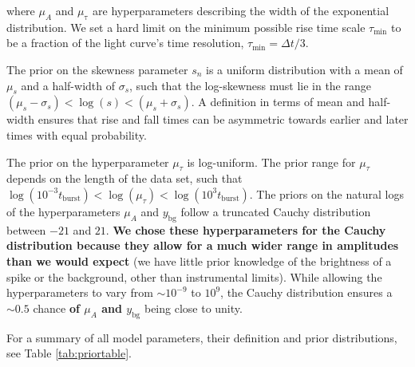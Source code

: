 \documentclass[12pt]{emulateapj}
\newcommand{\counts}{y}
\begin{document}
where $\mu_A$ and $\mu_{\mathrm{\tau}}$ are hyperparameters describing the width of the exponential distribution.
We set a hard limit on the minimum possible rise time scale
$\tau_{\mathrm{min}}$ to be a fraction of the light curve's time
resolution, $\tau_{\mathrm{min}} = \Delta t/3$. 

The prior on the skewness parameter $s_n$ is a uniform distribution with a mean of $\mu_s$ and a half-width of $\sigma_s$, such
that the log-skewness must lie in the range $(\mu_s-\sigma_s) < \log{(s)} < (\mu_s+\sigma_s)$. A definition in terms of mean and half-width ensures
that rise and fall times can be asymmetric towards earlier and later times with equal probability. 

The prior on the hyperparameter $\mu_{\tau}$ is log-uniform. The prior range for
$\mu_{\tau}$ depends on the length of the data set, such that $\log{(10^{-3}t_{\mathrm{burst}})} < \log{(\mu_{\tau})} < \log{(10^{3}t_\mathrm{burst})}$.
The priors on the natural logs of the hyperparameters $\mu_A$ and $\counts_{\mathrm{bg}}$ follow a truncated Cauchy distribution between $-21$ and $21$. {\bf We chose these hyperparameters for the Cauchy distribution because they allow for a much wider range in amplitudes than we would expect} (we have little prior knowledge of the brightness of a spike or the background, other than instrumental limits).
While allowing the hyperparameters to vary from $\sim 10^{-9}$ to $10^{9}$, the Cauchy distribution ensures a $\sim 0.5$ chance {\bf of $\mu_A$ and $\counts_{\mathrm{bg}}$ } being close to unity.

For a summary of all model parameters, their definition and prior distributions, see Table \ref{tab:priortable}.
\end{document}
